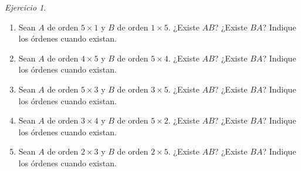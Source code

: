 \documentclass[12pt]{article}
\theoremstyle{remark}
\newtheorem{Ejer}[definicion]{Ejercicio}
\begin{document}
\begin{Ejer}
\begin{enumerate}[resume=banco]
\item Sean $A$ de orden $5\times1$ y $B$ de orden $1\times5$. ¿Existe $AB$? ¿Existe $BA$? Indique los órdenes cuando existan.

\item Sean $A$ de orden $4\times5$ y $B$ de orden $5\times4$. ¿Existe $AB$? ¿Existe $BA$? Indique los órdenes cuando existan.

\item Sean $A$ de orden $5\times3$ y $B$ de orden $3\times5$. ¿Existe $AB$? ¿Existe $BA$? Indique los órdenes cuando existan.

\item Sean $A$ de orden $3\times4$ y $B$ de orden $5\times2$. ¿Existe $AB$? ¿Existe $BA$? Indique los órdenes cuando existan.

\item Sean $A$ de orden $2\times3$ y $B$ de orden $2\times5$. ¿Existe $AB$? ¿Existe $BA$? Indique los órdenes cuando existan.

\end{enumerate}
\end{Ejer}
\end{document}
